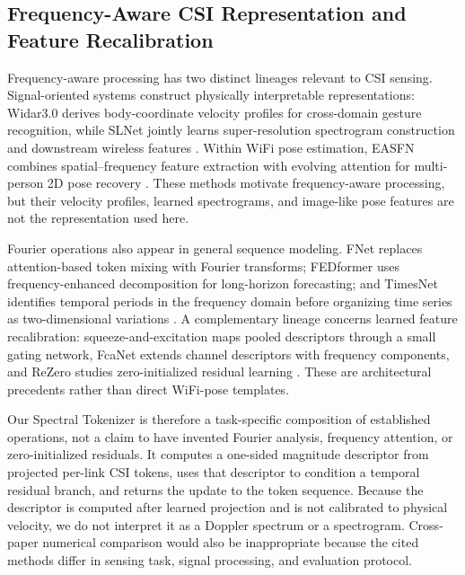 \documentclass[conference,onecolumn]{IEEEtran}
\begin{document}
\subsection{Frequency-Aware CSI Representation and Feature Recalibration}
Frequency-aware processing has two distinct lineages relevant to CSI sensing. Signal-oriented systems construct physically interpretable representations: Widar3.0 derives body-coordinate velocity profiles for cross-domain gesture recognition, while SLNet jointly learns super-resolution spectrogram construction and downstream wireless features \cite{zhang2021widar3,yang2023slnet}. Within WiFi pose estimation, EASFN combines spatial--frequency feature extraction with evolving attention for multi-person 2D pose recovery \cite{chen2023easfn}. These methods motivate frequency-aware processing, but their velocity profiles, learned spectrograms, and image-like pose features are not the representation used here.

Fourier operations also appear in general sequence modeling. FNet replaces attention-based token mixing with Fourier transforms; FEDformer uses frequency-enhanced decomposition for long-horizon forecasting; and TimesNet identifies temporal periods in the frequency domain before organizing time series as two-dimensional variations \cite{lee2022fnet,zhou2022fedformer,wu2023timesnet}. A complementary lineage concerns learned feature recalibration: squeeze-and-excitation maps pooled descriptors through a small gating network, FcaNet extends channel descriptors with frequency components, and ReZero studies zero-initialized residual learning \cite{hu2018senet,qin2021fcanet,bachlechner2021rezero}. These are architectural precedents rather than direct WiFi-pose templates.

Our Spectral Tokenizer is therefore a task-specific composition of established operations, not a claim to have invented Fourier analysis, frequency attention, or zero-initialized residuals. It computes a one-sided magnitude descriptor from projected per-link CSI tokens, uses that descriptor to condition a temporal residual branch, and returns the update to the token sequence. Because the descriptor is computed after learned projection and is not calibrated to physical velocity, we do not interpret it as a Doppler spectrum or a spectrogram. Cross-paper numerical comparison would also be inappropriate because the cited methods differ in sensing task, signal processing, and evaluation protocol.
\end{document}
